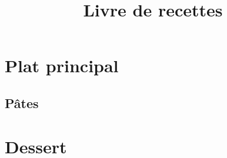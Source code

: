 \documentclass[a4paper, 12pt]{article}
\title{Livre de recettes}
\begin{document}
\maketitle

\tableofcontents
\clearpage

\section{Plat principal}

\subsection{Pâtes}


\clearpage

\clearpage

\clearpage

\clearpage

\clearpage


\clearpage

\section{Dessert}



\clearpage

\printindex
\end{document}
